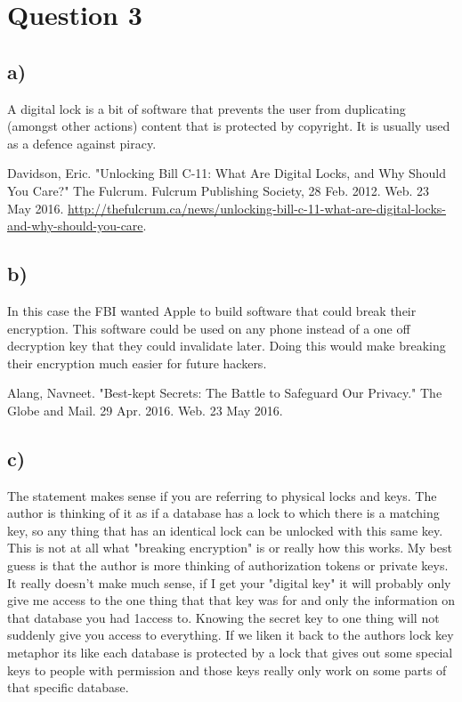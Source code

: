 \documentclass{article}
\begin{document}
\section*{Question 3} %
\label{sec:question_3}

\subsection*{a)} %
\label{sub:a_}
A digital lock is a bit of software that prevents the user from duplicating (amongst other actions) content that is protected by copyright. It is usually used as a defence against piracy.

Davidson, Eric. "Unlocking Bill C-11: What Are Digital Locks, and Why Should You Care?" The Fulcrum. Fulcrum Publishing Society, 28 Feb. 2012. Web. 23 May 2016. \newline \url{http://thefulcrum.ca/news/unlocking-bill-c-11-what-are-digital-locks-and-why-should-you-care}.


\subsection*{b)} %
\label{sub:b_}
In this case the FBI wanted Apple to build software that could break their encryption. This software could be used on any phone instead of a one off decryption key that they could invalidate later. Doing this would make breaking their encryption much easier for future hackers.

Alang, Navneet. "Best-kept Secrets: The Battle to Safeguard Our Privacy." The Globe and Mail. 29 Apr. 2016. Web. 23 May 2016.


\subsection*{c)} %
\label{sub:c_}
The statement makes sense if you are referring to physical locks and keys. The author is thinking of it as if a database has a lock to which there is a matching key, so any thing that has an identical lock can be unlocked with this same key. This is not at all what "breaking encryption" is or really how this works. My best guess is that the author is more thinking of authorization tokens or private keys. It really doesn't make much sense, if I get your "digital key" it will probably only give me access to the one thing that that key was for and only the information on that database you had 1access to. Knowing the secret key to one thing will not suddenly give you access to everything. If we liken it back to the authors lock key metaphor its like each database is protected by a lock that gives out some special keys to people with permission and those keys really only work on some parts of that specific database.
\end{document}
